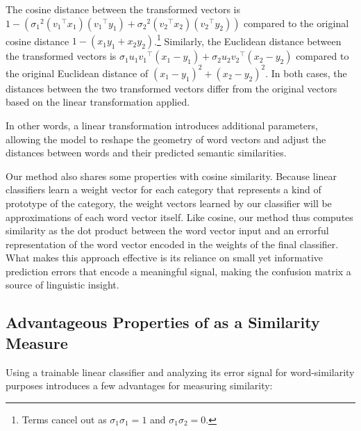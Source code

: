 The cosine distance between the transformed vectors is $1-({\sigma_1}^2({v_1}^{\intercal}x_1)({v_1}^{\intercal}y_1) + {\sigma_2}^2({v_2}^{\intercal}{x_2})({v_2}^{\intercal}{y_2}))$ compared to the original cosine distance $1 - (x_1y_1 + x_2y_2)$.\footnote{Terms cancel out as ${\sigma_1}{\sigma_1}=1$ and ${\sigma_1}{\sigma_2}=0$.} Similarly, the Euclidean distance between the transformed vectors is ${\sigma_1}{u_1v_1}^\intercal({x_1-y_1}) + {\sigma_2}{u_2v_2}^\intercal({x_2-y_2})$ compared to the original Euclidean distance of $(x_1-y_1)^2 + (x_2-y_2)^2$. In both cases, the distances between the two transformed vectors differ from the original vectors based on the linear transformation applied.

In other words, a linear transformation introduces additional parameters, allowing the model to reshape the geometry of word vectors and adjust the distances between words and their predicted semantic similarities.

Our method also shares some properties with cosine similarity.  Because linear classifiers learn a weight vector for each category that represents a kind of prototype of the category, the weight vectors learned by our classifier will be approximations of each word vector itself. Like cosine, our method thus computes similarity as the dot product between the word vector input and an errorful representation of the word vector encoded in the weights of the final classifier. What makes this approach effective is its reliance on small yet informative prediction errors that encode a meaningful signal, making the confusion matrix a source of linguistic insight.





\subsection{Advantageous Properties of \wc as a Similarity Measure}

Using a trainable linear classifier and analyzing its error signal for word-similarity purposes introduces a few advantages for measuring similarity:

